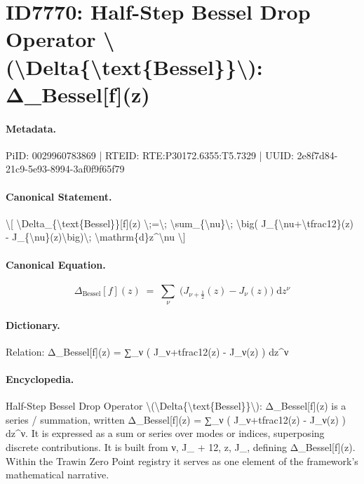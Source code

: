 \section*{ID7770: Half-Step Bessel Drop Operator \textbackslash{}(\textbackslash{}Delta\{\textbackslash{}text\{Bessel\}\}\textbackslash{}): Δ\_Bessel[f](z)}
\paragraph{Metadata.}
PiID: 0029960783869 | RTEID: RTE:P30172.6355:T5.7329 | UUID: 2e8f7d84-21c9-5e93-8994-3af0f9f65f79

\paragraph{Canonical Statement.}
\textbackslash{}[ \textbackslash{}Delta\_\{\textbackslash{}text\{Bessel\}\}[f](z) \textbackslash{};=\textbackslash{}; \textbackslash{}sum\_\{\textbackslash{}nu\}\textbackslash{}; \textbackslash{}big( J\_\{\textbackslash{}nu+\textbackslash{}tfrac12\}(z) - J\_\{\textbackslash{}nu\}(z)\textbackslash{}big)\textbackslash{}; \textbackslash{}mathrm\{d\}z\textasciicircum{}\textbackslash{}nu \textbackslash{}]

\paragraph{Canonical Equation.}
\[
\Delta_{\text{Bessel}}[f](z) \;=\; \sum_{\nu}\; \big( J_{\nu+\tfrac12}(z) - J_{\nu}(z)\big)\; \mathrm{d}z^\nu
\]

\paragraph{Dictionary.}
Relation: Δ\_Bessel[f](z) = ∑\_ν ( J\_ν+tfrac12(z) - J\_ν(z) ) dz\textasciicircum{}ν

\paragraph{Encyclopedia.}
Half-Step Bessel Drop Operator \textbackslash{}(\textbackslash{}Delta\{\textbackslash{}text\{Bessel\}\}\textbackslash{}): Δ\_Bessel[f](z) is a series / summation, written Δ\_Bessel[f](z) = ∑\_ν ( J\_ν+tfrac12(z) - J\_ν(z) ) dz\textasciicircum{}ν. It is expressed as a sum or series over modes or indices, superposing discrete contributions. It is built from ν, J\_ + 12, z, J\_, defining Δ\_Bessel[f](z). Within the Trawin Zero Point registry it serves as one element of the framework's mathematical narrative.
